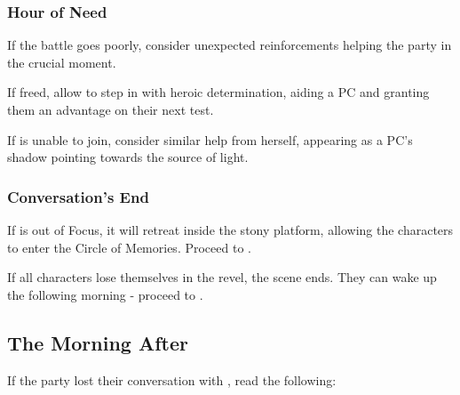 \subsubsection{Hour of Need}

If the battle goes poorly, consider unexpected reinforcements helping the party in the crucial moment. 

If freed, allow \npcRevelerGeneral{} to step in with heroic determination, aiding a PC and granting them an advantage on their next test.

If \npcRevelerGeneral{} is unable to join, consider similar help from \npcSjaAnat{} herself, appearing as a PC's shadow pointing towards the source of light.




\subsubsection{Conversation's End}

If \enemyHeartOfTheRevel{} is out of Focus, it will retreat inside the stony platform, allowing the characters to enter the Circle of Memories. Proceed to .

If all characters lose themselves in the revel, the scene ends. They can wake up the following morning - proceed to .




\subsection{The Morning After}
\label{ssec:heartOfTheRevelTPK}

If the party lost their conversation with \npcHeartRevel{}, read the following:


